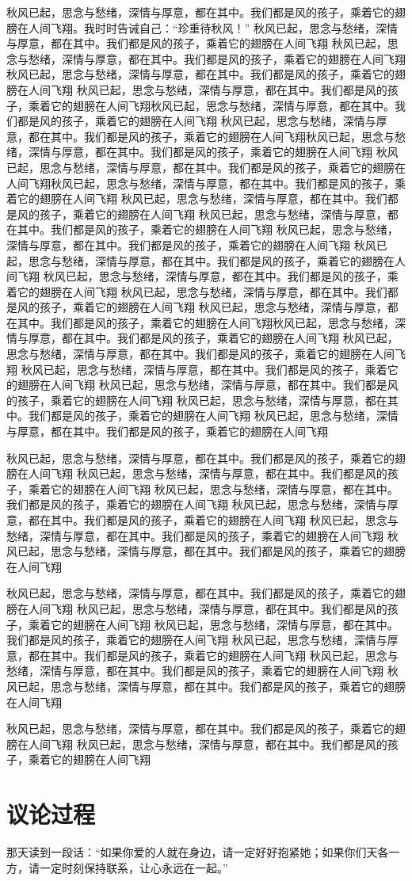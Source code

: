 \documentclass[a4paper,12pt]{report}
\begin{document}
秋风已起，思念与愁绪，深情与厚意，都在其中。我们都是风的孩子，乘着它的翅膀在人间飞翔。我时时告诫自己：“珍重待秋风！”
秋风已起，思念与愁绪，深情与厚意，都在其中。我们都是风的孩子，乘着它的翅膀在人间飞翔
秋风已起，思念与愁绪，深情与厚意，都在其中。我们都是风的孩子，乘着它的翅膀在人间飞翔秋风已起，思念与愁绪，深情与厚意，都在其中。我们都是风的孩子，乘着它的翅膀在人间飞翔
秋风已起，思念与愁绪，深情与厚意，都在其中。我们都是风的孩子，乘着它的翅膀在人间飞翔秋风已起，思念与愁绪，深情与厚意，都在其中。我们都是风的孩子，乘着它的翅膀在人间飞翔
秋风已起，思念与愁绪，深情与厚意，都在其中。我们都是风的孩子，乘着它的翅膀在人间飞翔秋风已起，思念与愁绪，深情与厚意，都在其中。我们都是风的孩子，乘着它的翅膀在人间飞翔
秋风已起，思念与愁绪，深情与厚意，都在其中。我们都是风的孩子，乘着它的翅膀在人间飞翔秋风已起，思念与愁绪，深情与厚意，都在其中。我们都是风的孩子，乘着它的翅膀在人间飞翔
秋风已起，思念与愁绪，深情与厚意，都在其中。我们都是风的孩子，乘着它的翅膀在人间飞翔
秋风已起，思念与愁绪，深情与厚意，都在其中。我们都是风的孩子，乘着它的翅膀在人间飞翔
秋风已起，思念与愁绪，深情与厚意，都在其中。我们都是风的孩子，乘着它的翅膀在人间飞翔
秋风已起，思念与愁绪，深情与厚意，都在其中。我们都是风的孩子，乘着它的翅膀在人间飞翔
秋风已起，思念与愁绪，深情与厚意，都在其中。我们都是风的孩子，乘着它的翅膀在人间飞翔
秋风已起，思念与愁绪，深情与厚意，都在其中。我们都是风的孩子，乘着它的翅膀在人间飞翔
秋风已起，思念与愁绪，深情与厚意，都在其中。我们都是风的孩子，乘着它的翅膀在人间飞翔秋风已起，思念与愁绪，深情与厚意，都在其中。我们都是风的孩子，乘着它的翅膀在人间飞翔
秋风已起，思念与愁绪，深情与厚意，都在其中。我们都是风的孩子，乘着它的翅膀在人间飞翔
秋风已起，思念与愁绪，深情与厚意，都在其中。我们都是风的孩子，乘着它的翅膀在人间飞翔
秋风已起，思念与愁绪，深情与厚意，都在其中。我们都是风的孩子，乘着它的翅膀在人间飞翔
秋风已起，思念与愁绪，深情与厚意，都在其中。我们都是风的孩子，乘着它的翅膀在人间飞翔
秋风已起，思念与愁绪，深情与厚意，都在其中。我们都是风的孩子，乘着它的翅膀在人间飞翔

秋风已起，思念与愁绪，深情与厚意，都在其中。我们都是风的孩子，乘着它的翅膀在人间飞翔
秋风已起，思念与愁绪，深情与厚意，都在其中。我们都是风的孩子，乘着它的翅膀在人间飞翔
秋风已起，思念与愁绪，深情与厚意，都在其中。我们都是风的孩子，乘着它的翅膀在人间飞翔
秋风已起，思念与愁绪，深情与厚意，都在其中。我们都是风的孩子，乘着它的翅膀在人间飞翔
秋风已起，思念与愁绪，深情与厚意，都在其中。我们都是风的孩子，乘着它的翅膀在人间飞翔
秋风已起，思念与愁绪，深情与厚意，都在其中。我们都是风的孩子，乘着它的翅膀在人间飞翔

秋风已起，思念与愁绪，深情与厚意，都在其中。我们都是风的孩子，乘着它的翅膀在人间飞翔
秋风已起，思念与愁绪，深情与厚意，都在其中。我们都是风的孩子，乘着它的翅膀在人间飞翔
秋风已起，思念与愁绪，深情与厚意，都在其中。我们都是风的孩子，乘着它的翅膀在人间飞翔
秋风已起，思念与愁绪，深情与厚意，都在其中。我们都是风的孩子，乘着它的翅膀在人间飞翔
秋风已起，思念与愁绪，深情与厚意，都在其中。我们都是风的孩子，乘着它的翅膀在人间飞翔
秋风已起，思念与愁绪，深情与厚意，都在其中。我们都是风的孩子，乘着它的翅膀在人间飞翔

秋风已起，思念与愁绪，深情与厚意，都在其中。我们都是风的孩子，乘着它的翅膀在人间飞翔
秋风已起，思念与愁绪，深情与厚意，都在其中。我们都是风的孩子，乘着它的翅膀在人间飞翔

\chapter{议论过程}

那天读到一段话：“如果你爱的人就在身边，请一定好好抱紧她；如果你们天各一方，请一定时刻保持联系，让心永远在一起。”
\end{document}
